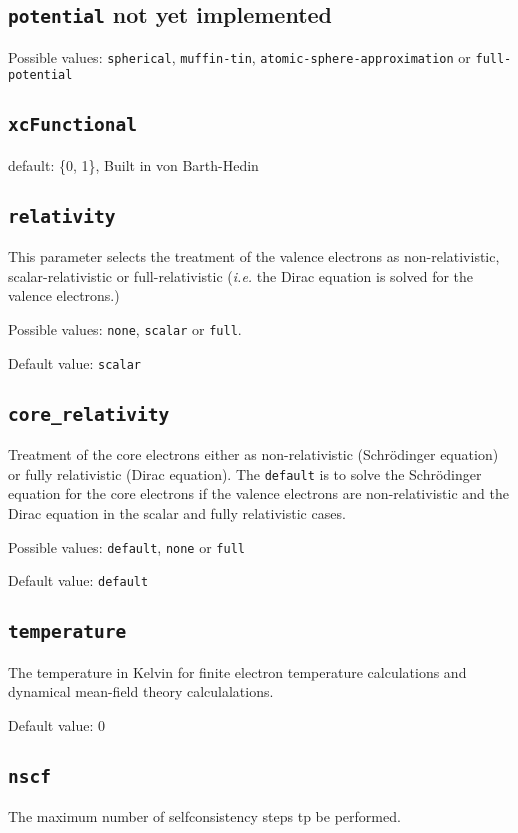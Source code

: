 \subsection{\texttt{potential} not yet implemented}
Possible values: \texttt{spherical}, \texttt{muffin-tin},
\texttt{atomic-sphere-approximation} or \texttt{full-potential}

\subsection{\texttt{xcFunctional}}
default: \{0, 1\}, Built in von Barth-Hedin

\subsection{\texttt{relativity}}
This parameter selects the treatment of the valence electrons as non-relativistic, scalar-relativistic
or full-relativistic (\textit{i.e.} the Dirac equation is solved for the valence electrons.)

Possible values: \texttt{none}, \texttt{scalar} or \texttt{full}.

Default value: \texttt{scalar} 

\subsection{\texttt{core\_relativity}}
Treatment of the core electrons either as non-relativistic (Schr\"odinger equation)
or fully relativistic (Dirac equation).
The \texttt{default} is to solve the Schr\"odinger equation for the core electrons if the valence
electrons are non-relativistic and the Dirac equation in the scalar and fully relativistic cases.
 
Possible values: \texttt{default}, \texttt{none} or \texttt{full}

Default value: \texttt{default}

\subsection{\texttt{temperature}}
The temperature in Kelvin for finite electron temperature
calculations and dynamical mean-field theory calculalations.

Default value: 0

\subsection{\texttt{nscf}}
The maximum number of selfconsistency steps tp be performed.

